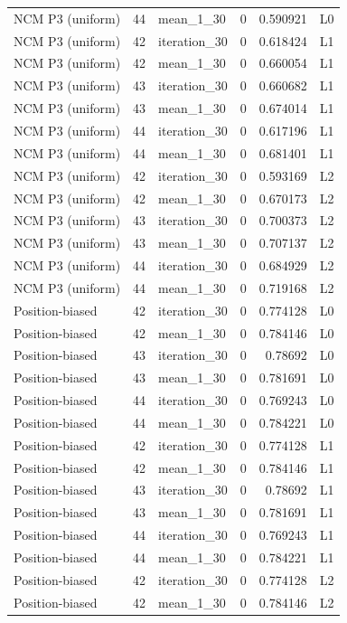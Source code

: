 \begin{table}[htbp!]
\begin{tabular}{lrlrrl}
NCM P3 (uniform) & 44 & mean\_1\_30 & 0 & 0.590921 & L0 \\
NCM P3 (uniform) & 42 & iteration\_30 & 0 & 0.618424 & L1 \\
NCM P3 (uniform) & 42 & mean\_1\_30 & 0 & 0.660054 & L1 \\
NCM P3 (uniform) & 43 & iteration\_30 & 0 & 0.660682 & L1 \\
NCM P3 (uniform) & 43 & mean\_1\_30 & 0 & 0.674014 & L1 \\
NCM P3 (uniform) & 44 & iteration\_30 & 0 & 0.617196 & L1 \\
NCM P3 (uniform) & 44 & mean\_1\_30 & 0 & 0.681401 & L1 \\
NCM P3 (uniform) & 42 & iteration\_30 & 0 & 0.593169 & L2 \\
NCM P3 (uniform) & 42 & mean\_1\_30 & 0 & 0.670173 & L2 \\
NCM P3 (uniform) & 43 & iteration\_30 & 0 & 0.700373 & L2 \\
NCM P3 (uniform) & 43 & mean\_1\_30 & 0 & 0.707137 & L2 \\
NCM P3 (uniform) & 44 & iteration\_30 & 0 & 0.684929 & L2 \\
NCM P3 (uniform) & 44 & mean\_1\_30 & 0 & 0.719168 & L2 \\
Position-biased & 42 & iteration\_30 & 0 & 0.774128 & L0 \\
Position-biased & 42 & mean\_1\_30 & 0 & 0.784146 & L0 \\
Position-biased & 43 & iteration\_30 & 0 & 0.78692 & L0 \\
Position-biased & 43 & mean\_1\_30 & 0 & 0.781691 & L0 \\
Position-biased & 44 & iteration\_30 & 0 & 0.769243 & L0 \\
Position-biased & 44 & mean\_1\_30 & 0 & 0.784221 & L0 \\
Position-biased & 42 & iteration\_30 & 0 & 0.774128 & L1 \\
Position-biased & 42 & mean\_1\_30 & 0 & 0.784146 & L1 \\
Position-biased & 43 & iteration\_30 & 0 & 0.78692 & L1 \\
Position-biased & 43 & mean\_1\_30 & 0 & 0.781691 & L1 \\
Position-biased & 44 & iteration\_30 & 0 & 0.769243 & L1 \\
Position-biased & 44 & mean\_1\_30 & 0 & 0.784221 & L1 \\
Position-biased & 42 & iteration\_30 & 0 & 0.774128 & L2 \\
Position-biased & 42 & mean\_1\_30 & 0 & 0.784146 & L2 \\

\end{tabular}
\end{table}

